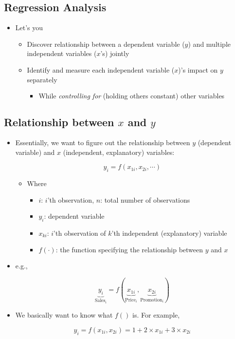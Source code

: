 \documentclass[10pt,article]{article}
\begin{document}
\subsection{Regression Analysis}
\label{sec:orgf7e9c00}
\begin{itemize}
\item Let's you

\begin{itemize}
\item Discover relationship between a dependent variable (\(y\)) and 
multiple independent variables (\(x\)'s) jointly
\item Identify and measure each independent variable (\(x\))'s impact on 
\(y\) separately 
\begin{itemize}
\item While \emph{controlling for} (holding others constant) other variables
\end{itemize}
\end{itemize}
\end{itemize}

\subsection{Relationship between \(x\) and \(y\)}
\label{sec:orge82feab}
\begin{itemize}
\item Essentially, we want to figure out the relationship between \(y\)
(dependent variable) and \(x\) (independent, explanatory) variables:

\[ y_i = f(x_{1i}, x_{2i}, \cdots) \]

\begin{itemize}
\item Where

\begin{itemize}
\item \(i\): \(i\)'th observation, \(n\): total number of observations
\item \(y_i\): dependent variable
\item \(x_{ki}\): \(i\)'th observation of \(k\)'th independent
(explanatory) variable
\item \(f(\cdot)\): the function specifying the relationship between \(y\)
and \(x\)
\end{itemize}
\end{itemize}
\end{itemize}

\begin{itemize}
\item e.g.,

\[ \underbrace{y_{i}}_{\text{Sales}_i} = f(\underbrace{x_{
  1i}}_{\text{Price}_i}, \underbrace{x_{2i}}_{\text{Promotion}_i}) \]

\item We basically want to know what \(f()\) is. For example,

\[ y_{i} = f(x_{1i}, x_{2i}) = 1 + 2 \times x_{1i}  + 3 \times x_{2i} \]
\end{itemize}
\end{document}
